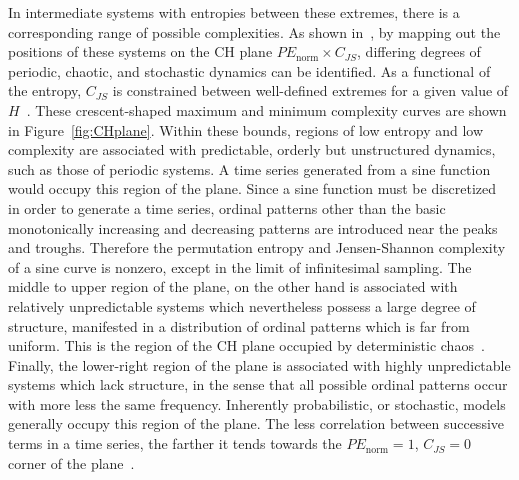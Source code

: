 \documentclass[aps,prx,twocolumn,secnumarabic,nobalancelastpage,amsmath,amssymb,
nofootinbib]{revtex4-1}
\begin{document}
In intermediate systems with entropies between these extremes, there is a corresponding range of possible complexities. As shown in~\cite{rosso2007}, by mapping out the positions of these systems on the CH plane $PE_\text{norm} \times C_{JS}$, differing degrees of periodic, chaotic, and stochastic dynamics can be identified. As a functional of the entropy, $C_{JS}$ is constrained between well-defined extremes for a given value of $H$~\cite{lopez1995,calbet2001}. These crescent-shaped maximum and minimum complexity curves are shown in Figure~\ref{fig:CHplane}. Within these bounds, regions of low entropy and low complexity are associated with predictable, orderly but unstructured dynamics, such as those of periodic systems. A time series generated from a sine function would occupy this region of the plane. Since a sine function must be discretized in order to generate a time series, ordinal patterns other than the basic monotonically increasing and decreasing patterns are introduced near the peaks and troughs. Therefore the permutation entropy and Jensen-Shannon complexity of a sine curve is nonzero, except in the limit of infinitesimal sampling. The middle to upper region of the plane, on the other hand is associated with relatively unpredictable systems which nevertheless possess a large degree of structure, manifested in a distribution of ordinal patterns which is far from uniform. This is the region of the CH plane occupied by deterministic chaos~\cite{rosso2007}. Finally, the lower-right region of the plane is associated with highly unpredictable systems which lack structure, in the sense that all possible ordinal patterns occur with more less the same frequency. Inherently probabilistic, or stochastic, models generally occupy this region of the plane. The less correlation between successive terms in a time series, the farther it tends towards the $PE_\text{norm}=1$, $C_{JS}=0$ corner of the plane~\cite{rosso2007}.
\end{document}

